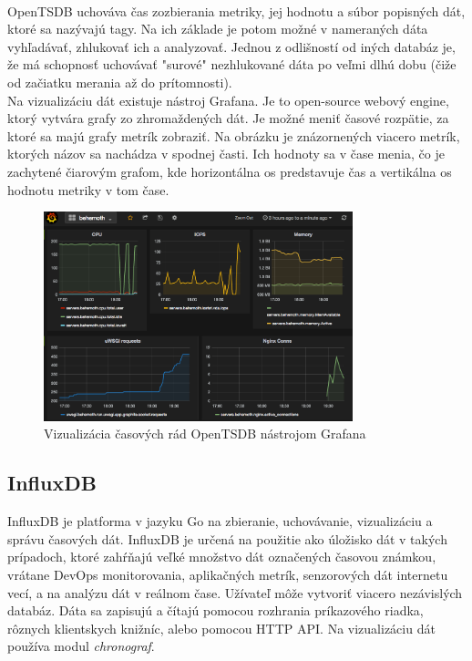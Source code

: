 \documentclass[12pt,twoside,color,cover,table]{fithesis3}
\begin{document}
\\OpenTSDB uchováva čas zozbierania metriky, jej hodnotu a súbor popisných dát, ktoré sa nazývajú tagy. Na ich základe je potom možné
v nameraných dáta vyhľadávať, zhlukovať ich a analyzovať. Jednou z odlišností od iných databáz je, že má schopnosť uchovávať "surové" nezhlukované dáta po veľmi dlhú dobu (čiže od začiatku merania až do prítomnosti).
\\Na vizualizáciu dát existuje nástroj Grafana. Je to open-source webový engine, ktorý vytvára grafy zo zhromaždených dát. Je možné meniť časové rozpätie, za ktoré sa majú grafy metrík zobraziť.
Na obrázku je znázornených viacero metrík, ktorých názov sa nachádza v spodnej časti. Ich hodnoty sa v čase menia, čo je zachytené čiarovým grafom, kde horizontálna os predstavuje čas a vertikálna os hodnotu
metriky v tom čase.
\begin{figure}[h]
\begin{center}
       \includegraphics[width=0.8\textwidth]{images/grafana.png}
       \caption{Vizualizácia časových rád OpenTSDB nástrojom Grafana}%
\end{center}
\end{figure}

\subsection{InfluxDB}
InfluxDB je platforma v jazyku Go na zbieranie, uchovávanie, vizualizáciu a správu časových dát. InfluxDB je určená na použitie ako úložisko dát v takých prípadoch, ktoré zahŕňajú veľké množstvo
dát označených časovou známkou, vrátane DevOps monitorovania, aplikačných metrík, senzorových dát internetu vecí, a na analýzu dát v reálnom čase.%
 Užívateľ môže vytvoriť viacero nezávislých databáz. 
Dáta sa zapisujú a čítajú pomocou rozhrania príkazového riadka, rôznych klientskych knižníc, alebo pomocou HTTP API. Na vizualizáciu dát používa modul \emph{chronograf}.
\end{document}
